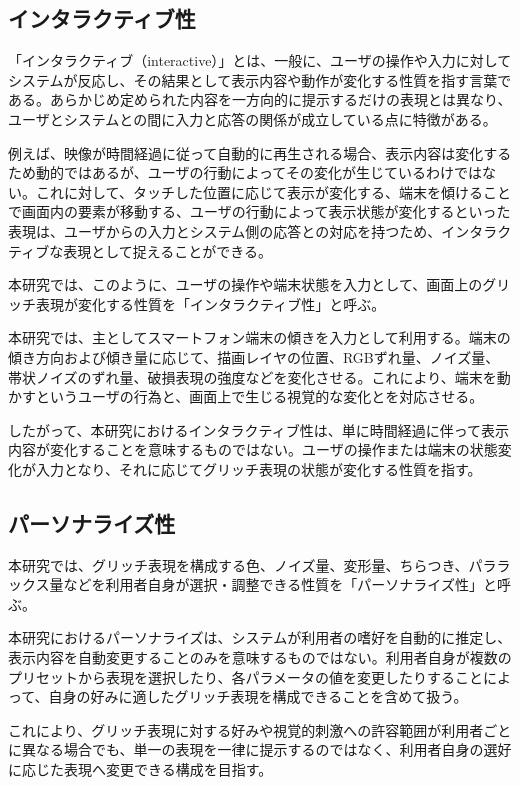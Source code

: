 \subsection{インタラクティブ性}

「インタラクティブ（interactive）」とは、一般に、ユーザの操作や入力に対してシステムが反応し、その結果として表示内容や動作が変化する性質を指す言葉である。あらかじめ定められた内容を一方向的に提示するだけの表現とは異なり、ユーザとシステムとの間に入力と応答の関係が成立している点に特徴がある。

例えば、映像が時間経過に従って自動的に再生される場合、表示内容は変化するため動的ではあるが、ユーザの行動によってその変化が生じているわけではない。これに対して、タッチした位置に応じて表示が変化する、端末を傾けることで画面内の要素が移動する、ユーザの行動によって表示状態が変化するといった表現は、ユーザからの入力とシステム側の応答との対応を持つため、インタラクティブな表現として捉えることができる。

本研究では、このように、ユーザの操作や端末状態を入力として、画面上のグリッチ表現が変化する性質を「インタラクティブ性」と呼ぶ。

本研究では、主としてスマートフォン端末の傾きを入力として利用する。端末の傾き方向および傾き量に応じて、描画レイヤの位置、RGBずれ量、ノイズ量、帯状ノイズのずれ量、破損表現の強度などを変化させる。これにより、端末を動かすというユーザの行為と、画面上で生じる視覚的な変化とを対応させる。

したがって、本研究におけるインタラクティブ性は、単に時間経過に伴って表示内容が変化することを意味するものではない。ユーザの操作または端末の状態変化が入力となり、それに応じてグリッチ表現の状態が変化する性質を指す。



\subsection{パーソナライズ性}

本研究では、グリッチ表現を構成する色、ノイズ量、変形量、ちらつき、パララックス量などを利用者自身が選択・調整できる性質を「パーソナライズ性」と呼ぶ。

本研究におけるパーソナライズは、システムが利用者の嗜好を自動的に推定し、表示内容を自動変更することのみを意味するものではない。利用者自身が複数のプリセットから表現を選択したり、各パラメータの値を変更したりすることによって、自身の好みに適したグリッチ表現を構成できることを含めて扱う。

これにより、グリッチ表現に対する好みや視覚的刺激への許容範囲が利用者ごとに異なる場合でも、単一の表現を一律に提示するのではなく、利用者自身の選好に応じた表現へ変更できる構成を目指す。



